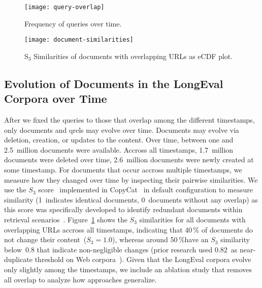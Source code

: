 

\begin{figure}[t]
    \begin{minipage}{.49\textwidth}
        \texttt{[image: query-overlap]}
        \vspace{-4ex}
        \caption{Frequency of queries over time.}
        \label{fig:query-overlap}
    \end{minipage}
    \hfill    
    \begin{minipage}{.49\textwidth}
        \texttt{[image: document-similarities]}
        \vspace{-4ex}
        \caption{S$_{3}$ Similarities of documents with overlapping URLs as eCDF plot.}
        \label{fig:document-similarities}
    \end{minipage}
\end{figure}

\subsection{Evolution of Documents in the LongEval Corpora over Time}

After we fixed the queries to those that overlap among the different timestamps, only documents and qrels may evolve over time. Documents may evolve via deletion, creation, or updates to the content. Over time, between one and 2.5~million documents were available. Accross all timestamps, 1.7~million documents were deleted over time, 2.6~million documents were newly created at some timestamp. For documents that occur accross multiple timestamps, we measure how they changed over time by inspecting their pairwise similarities. We use the $S_{3}$ score~\cite{bernstein:2005} implemented in CopyCat~\cite{froebe:2021a} in default configuration to measure similarity (1~indicates identical documents, 0~documents without any overlap) as this score was specifically developed to identify redundant documents within retrieval scenarios~\cite{bernstein:2005}. Figure~\ref{fig:document-similarities} shows the $S_{3}$ similarities for all documents with overlapping URLs accross all timestamps, indicating that 40\,\% of documents do not change their content~($S_{3}=1.0$), whereas around 50\,\%have an $S_{3}$ similarity below~0.8 that indicate non-negligible changes (prior research used 0.82~as near-duplicate threshold on Web corpora~\cite{froebe:2021a}). Given that the LongEval corpora evolve only slightly among the timestamps, we include an ablation study that removes all overlap to analyze how approaches generalize.



